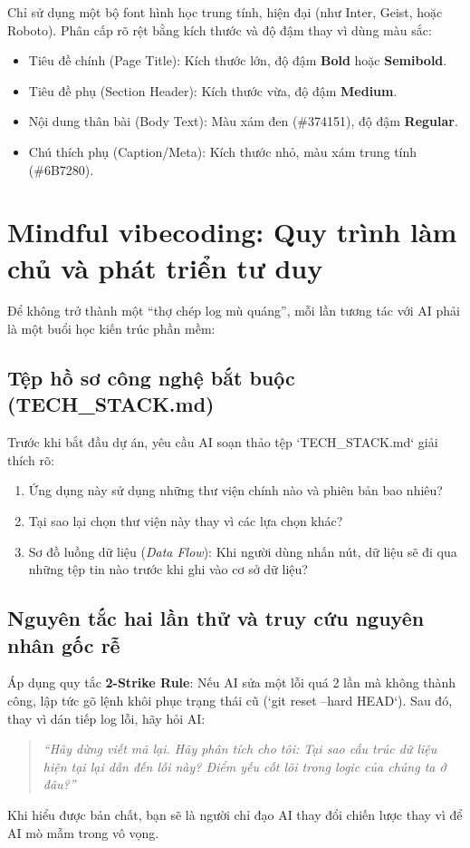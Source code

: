 \documentclass[a4paper,11pt]{article}
\begin{document}
Chỉ sử dụng một bộ font hình học trung tính, hiện đại (như Inter, Geist, hoặc Roboto). Phân cấp rõ rệt bằng kích thước và độ đậm thay vì dùng màu sắc:
\begin{itemize}[leftmargin=1.5em]
    \item Tiêu đề chính (Page Title): Kích thước lớn, độ đậm \textbf{Bold} hoặc \textbf{Semibold}.
    \item Tiêu đề phụ (Section Header): Kích thước vừa, độ đậm \textbf{Medium}.
    \item Nội dung thân bài (Body Text): Màu xám đen (\#374151), độ đậm \textbf{Regular}.
    \item Chú thích phụ (Caption/Meta): Kích thước nhỏ, màu xám trung tính (\#6B7280).
\end{itemize}

\section{Mindful vibecoding: Quy trình làm chủ và phát triển tư duy}

Để không trở thành một ``thợ chép log mù quáng'', mỗi lần tương tác với AI phải là một buổi học kiến trúc phần mềm:

\subsection{Tệp hồ sơ công nghệ bắt buộc (TECH\_STACK.md)}

Trước khi bắt đầu dự án, yêu cầu AI soạn thảo tệp `TECH\_STACK.md` giải thích rõ:
\begin{enumerate}[label={\arabic*.}]
    \item Ứng dụng này sử dụng những thư viện chính nào và phiên bản bao nhiêu?
    \item Tại sao lại chọn thư viện này thay vì các lựa chọn khác?
    \item Sơ đồ luồng dữ liệu (\textit{Data Flow}): Khi người dùng nhấn nút, dữ liệu sẽ đi qua những tệp tin nào trước khi ghi vào cơ sở dữ liệu?
\end{enumerate}

\subsection{Nguyên tắc hai lần thử và truy cứu nguyên nhân gốc rễ}

Áp dụng quy tắc \textbf{2-Strike Rule}: Nếu AI sửa một lỗi quá 2 lần mà không thành công, lập tức gõ lệnh khôi phục trạng thái cũ (`git reset --hard HEAD`). Sau đó, thay vì dán tiếp log lỗi, hãy hỏi AI:
\begin{quote}
\itshape
``Hãy dừng viết mã lại. Hãy phân tích cho tôi: Tại sao cấu trúc dữ liệu hiện tại lại dẫn đến lỗi này? Điểm yếu cốt lõi trong logic của chúng ta ở đâu?''
\end{quote}
Khi hiểu được bản chất, bạn sẽ là người chỉ đạo AI thay đổi chiến lược thay vì để AI mò mẫm trong vô vọng.
\end{document}
